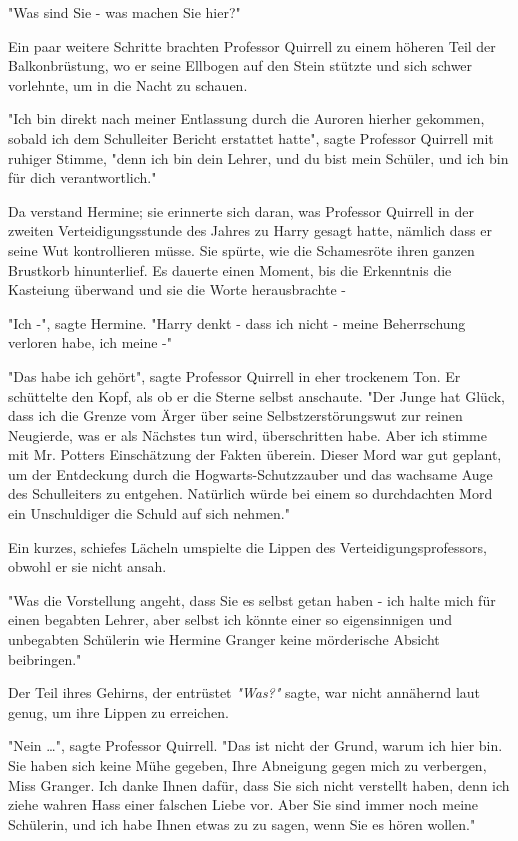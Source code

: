 {"Was sind Sie - was machen Sie hier?"

Ein paar weitere Schritte brachten Professor Quirrell zu einem höheren Teil der Balkonbrüstung, wo er seine Ellbogen auf den Stein stützte und sich schwer vorlehnte, um in die Nacht zu schauen.

"Ich bin direkt nach meiner Entlassung durch die Auroren hierher gekommen, sobald ich dem Schulleiter Bericht erstattet hatte", sagte Professor Quirrell mit ruhiger Stimme, "denn ich bin dein Lehrer, und du bist mein Schüler, und ich bin für dich verantwortlich."

Da verstand Hermine; sie erinnerte sich daran, was Professor Quirrell in der zweiten Verteidigungsstunde des Jahres zu Harry gesagt hatte, nämlich dass er seine Wut kontrollieren müsse. Sie spürte, wie die Schamesröte ihren ganzen Brustkorb hinunterlief. Es dauerte einen Moment, bis die Erkenntnis die Kasteiung überwand und sie die Worte herausbrachte -

"Ich -", sagte Hermine. "Harry denkt - dass ich nicht - meine Beherrschung verloren habe, ich meine -"

"Das habe ich gehört", sagte Professor Quirrell in eher trockenem Ton. Er schüttelte den Kopf, als ob er die Sterne selbst anschaute. "Der Junge hat Glück, dass ich die Grenze vom Ärger über seine Selbstzerstörungswut zur reinen Neugierde, was er als Nächstes tun wird, überschritten habe. Aber ich stimme mit Mr. Potters Einschätzung der Fakten überein. Dieser Mord war gut geplant, um der Entdeckung durch die Hogwarts-Schutzzauber und das wachsame Auge des Schulleiters zu entgehen. Natürlich würde bei einem so durchdachten Mord ein Unschuldiger die Schuld auf sich nehmen."

Ein kurzes, schiefes Lächeln umspielte die Lippen des Verteidigungsprofessors, obwohl er sie nicht ansah.

"Was die Vorstellung angeht, dass Sie es selbst getan haben - ich halte mich für einen begabten Lehrer, aber selbst ich könnte einer so eigensinnigen und unbegabten Schülerin wie Hermine Granger keine mörderische Absicht beibringen."

Der Teil ihres Gehirns, der entrüstet \emph{"Was?"} sagte, war nicht annähernd laut genug, um ihre Lippen zu erreichen.

"Nein …", sagte Professor Quirrell. "Das ist nicht der Grund, warum ich hier bin. Sie haben sich keine Mühe gegeben, Ihre Abneigung gegen mich zu verbergen, Miss Granger. Ich danke Ihnen dafür, dass Sie sich nicht verstellt haben, denn ich ziehe wahren Hass einer falschen Liebe vor. Aber Sie sind immer noch meine Schülerin, und ich habe Ihnen etwas zu zu sagen, wenn Sie es hören wollen."

}
